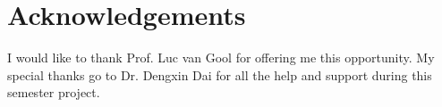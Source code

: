 %


\newpage

\chapter*{Acknowledgements}
I would like to thank Prof. Luc van Gool for offering me this opportunity. My special thanks go to Dr. Dengxin Dai for all the help and support during this semester project.

